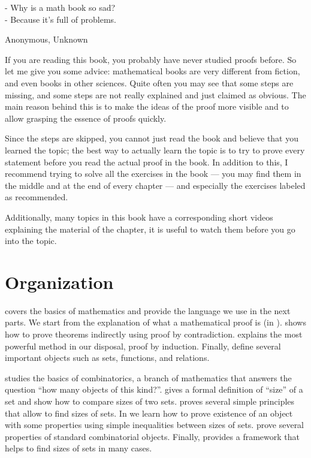 \epigraph{
    - Why is a math book so sad? \\
    - Because it's full of problems.
}{Anonymous, Unknown}


If you are reading this book, you probably have never studied proofs before.
So let me give you some advice: mathematical books are very different from
fiction, and even books in other sciences. Quite often you may see that some
steps are missing, and some steps are not really explained and just claimed as
obvious. The main reason behind this is to make the ideas of the proof more
visible and to allow grasping the essence of proofs quickly.

Since the steps are skipped, you cannot just read the book and believe that you
learned the topic; the best way to actually learn the topic is to try to prove
every statement before you read the actual proof in the book. In addition to
this, I recommend trying to solve all the exercises in the book --- you may find
them in the middle and at the end of every chapter --- and especially the
exercises labeled as recommended.

Additionally, many topics in this book have a corresponding short videos
explaining the material of the chapter, it is useful to watch them before you go
into the topic.

\section*{Organization}
 covers the basics of mathematics and
provide the language we use in the next parts. We start from the explanation of
what a mathematical proof is (in ).
 shows how to prove theorems indirectly
using proof by contradiction.  explains the most
powerful method in our disposal, proof by induction. Finally,
define several important objects such as sets, functions, and relations.

 studies the basics of combinatorics, a branch of
mathematics that answers the question ``how many objects of this kind?''.
 gives a formal
definition of ``size'' of a set and show how to compare sizes of two sets.
 proves several simple principles that allow to
find sizes of sets. In  we learn how to prove existence
of an object with some properties using simple inequalities between sizes of
sets.  prove
several properties of standard combinatorial objects. Finally,
 provides a framework that helps to find
sizes of sets in many cases.


